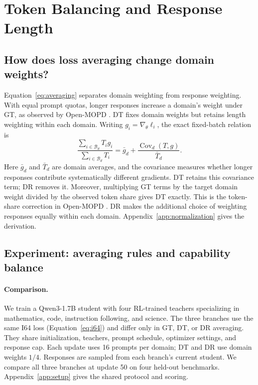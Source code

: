 \section{Token Balancing and Response Length}
\label{sec:normalization}

\subsection{How does loss averaging change domain weights?}

Equation~\ref{eq:averaging} separates domain weighting from response weighting. With equal prompt quotas, longer responses increase a domain's weight under GT, as observed by Open-MOPD \citep[Section~3.3]{gao2026openmopddiagnosingfixingcapability}. DT fixes domain weights but retains length weighting within each domain. Writing $g_i=\nabla_\theta\ell_i$, the exact fixed-batch relation is
\begin{equation}
\frac{\sum_{i\in\mathcal B_d}T_i g_i}{\sum_{i\in\mathcal B_d}T_i}
=\bar g_d+\frac{\operatorname{Cov}_d(T,g)}{\bar T_d}.
\label{eq:weighting}
\end{equation}
Here $\bar g_d$ and $\bar T_d$ are domain averages, and the covariance measures whether longer responses contribute systematically different gradients. DT retains this covariance term; DR removes it. Moreover, multiplying GT terms by the target domain weight divided by the observed token share gives DT exactly. This is the token-share correction in Open-MOPD \citep[Section~4.1, Eq.~(8)]{gao2026openmopddiagnosingfixingcapability}. DR makes the additional choice of weighting responses equally within each domain. Appendix~\ref{app:normalization} gives the derivation.

\subsection{Experiment: averaging rules and capability balance}

\paragraph{Comparison.}
We train a Qwen3-1.7B student with four RL-trained teachers specializing in mathematics, code, instruction following, and science. The three branches use the same I64 loss (Equation~\ref{eq:i64}) and differ only in GT, DT, or DR averaging. They share initialization, teachers, prompt schedule, optimizer settings, and response cap. Each update uses 16 prompts per domain; DT and DR use domain weights $1/4$. Responses are sampled from each branch's current student. We compare all three branches at update 50 on four held-out benchmarks. Appendix~\ref{app:setup} gives the shared protocol and scoring.

